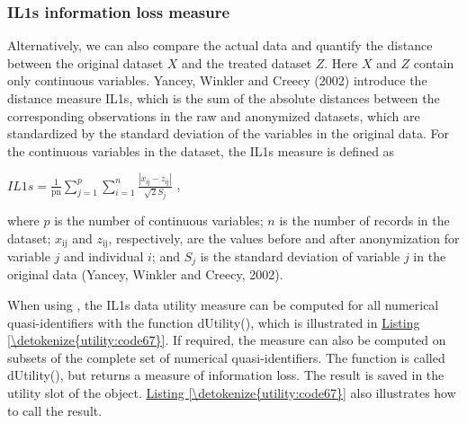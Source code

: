 \documentclass[letterpaper,10pt,english]{sphinxmanual}
\begin{document}
\subsubsection{IL1s information loss measure}
\label{\detokenize{utility:il1s-information-loss-measure}}
Alternatively, we can also compare the actual data and quantify the
distance between the original dataset \(X\) and the treated dataset
\(Z\). Here \(X\) and \(Z\) contain only continuous
variables. Yancey, Winkler and Creecy (2002) introduce the distance
measure IL1s, which is the sum of the absolute distances between the
corresponding observations in the raw and anonymized datasets, which are
standardized by the standard deviation of the variables in the original
data. For the continuous variables in the dataset, the IL1s measure is
defined as

\(IL1s = \frac{1}{\text{pn}}\sum_{j = 1}^{p}{\sum_{i = 1}^{n}\frac{\left| x_{\text{ij}} - z_{\text{ij}} \right|}{\sqrt{2}S_{j}}}\)
,

where \(p\) is the number of continuous variables; \(n\) is the
number of records in the dataset; \(x_{\text{ij}}\) and
\(z_{\text{ij}}\), respectively, are the values before and after
anonymization for variable \(j\) and individual \(i\); and
\(S_{j}\) is the standard deviation of variable \(j\) in the
original data (Yancey, Winkler and Creecy, 2002).

When using , the IL1s data utility measure can be computed for
all numerical quasi-identifiers with the function dUtility(), which is
illustrated in \hyperref[\detokenize{utility:code67}]{Listing \ref{\detokenize{utility:code67}}}. If required, the measure can also be
computed on subsets of the complete set of numerical quasi-identifiers.
The function is called dUtility(), but returns a measure of information
loss. The result is saved in the utility slot of the  object.
\hyperref[\detokenize{utility:code67}]{Listing \ref{\detokenize{utility:code67}}} also illustrates how to call the result.
\end{document}
